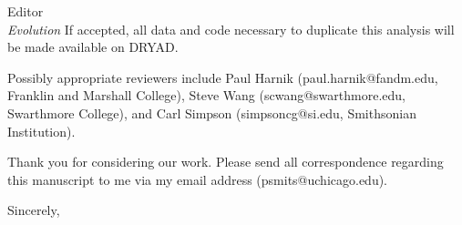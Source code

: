 \documentclass{letter}
\begin{document}
\begin{letter}{Editor \\ \textit{Evolution}}
  If accepted, all data and code necessary to duplicate this analysis will be made available on DRYAD.

  Possibly appropriate reviewers include Paul Harnik (paul.harnik@fandm.edu, Franklin and Marshall College), Steve Wang (scwang@swarthmore.edu, Swarthmore College), and Carl Simpson (simpsoncg@si.edu, Smithsonian Institution).
  
  Thank you for considering our work. Please send all correspondence regarding this manuscript to me via my email address (psmits@uchicago.edu).

  \closing{Sincerely,}


\end{letter}


\end{document}

